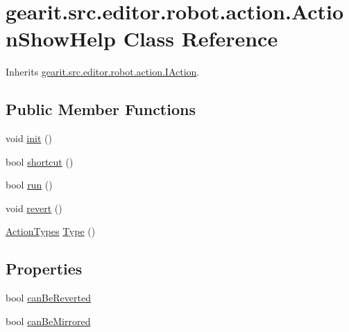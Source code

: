 \hypertarget{classgearit_1_1src_1_1editor_1_1robot_1_1action_1_1_action_show_help}{\section{gearit.\+src.\+editor.\+robot.\+action.\+Action\+Show\+Help Class Reference}
\label{classgearit_1_1src_1_1editor_1_1robot_1_1action_1_1_action_show_help}
}


Inherits \hyperlink{interfacegearit_1_1src_1_1editor_1_1robot_1_1action_1_1_i_action}{gearit.\+src.\+editor.\+robot.\+action.\+I\+Action}.

\subsection*{Public Member Functions}
\begin{DoxyCompactItemize}
\item 
void \hyperlink{classgearit_1_1src_1_1editor_1_1robot_1_1action_1_1_action_show_help_a8acd3824abefb42cea92e9da7ae5a00b}{init} ()
\item 
bool \hyperlink{classgearit_1_1src_1_1editor_1_1robot_1_1action_1_1_action_show_help_abb4339dc94c96c04007af45b1032b37d}{shortcut} ()
\item 
bool \hyperlink{classgearit_1_1src_1_1editor_1_1robot_1_1action_1_1_action_show_help_adaa80e37ef526fee48d347c2212172fd}{run} ()
\item 
void \hyperlink{classgearit_1_1src_1_1editor_1_1robot_1_1action_1_1_action_show_help_a084fd3539af7ab692624047d9dc9b44d}{revert} ()
\item 
\hyperlink{namespacegearit_1_1src_1_1editor_1_1robot_1_1action_a4be0fd46e3952d6135136b20e7b3fc5e}{Action\+Types} \hyperlink{classgearit_1_1src_1_1editor_1_1robot_1_1action_1_1_action_show_help_aeaebf56a46081242e2f1a33f8e9c38f1}{Type} ()
\end{DoxyCompactItemize}
\subsection*{Properties}
\begin{DoxyCompactItemize}
\item 
bool \hyperlink{classgearit_1_1src_1_1editor_1_1robot_1_1action_1_1_action_show_help_a60bcb43322fdcba4a9b9416bcdced1c8}{can\+Be\+Reverted}
\item 
bool \hyperlink{classgearit_1_1src_1_1editor_1_1robot_1_1action_1_1_action_show_help_a69e1229508bb9870baa2e485beda03e6}{can\+Be\+Mirrored}
\end{DoxyCompactItemize}



